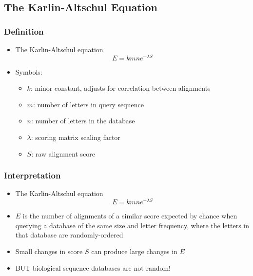 %

\subsection{The Karlin-Altschul Equation}
\begin{frame}
  \frametitle{Definition}
  \begin{itemize}
    \item The Karlin-Altschul equation
    \begin{equation*}
      E = k m n e^{-\lambda S}
    \end{equation*}
    \item Symbols:
    \begin{itemize}
      \item $k$: minor constant, adjusts for correlation between alignments
      \item $m$: number of letters in query sequence
      \item $n$: number of letters in the database
      \item $\lambda$: scoring matrix scaling factor
      \item $S$: raw alignment score
    \end{itemize}
  \end{itemize}
\end{frame} 

\begin{frame}
  \frametitle{Interpretation}
  \begin{itemize}
    \item The Karlin-Altschul equation
    \begin{equation*}
      E = k m n e^{-\lambda S}
    \end{equation*}
    \item $E$ is the number of alignments of a similar score expected by chance when querying a database of the same size and letter frequency, where the letters in that database are randomly-ordered
    \item Small changes in score $S$ can produce large changes in $E$
    \item BUT biological sequence databases are not random!
  \end{itemize}
\end{frame} 